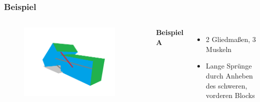 \documentclass{beamer}
\begin{document}
\begin{frame}
	\frametitle{Beispiel}
	\begin{columns}
		\begin{figure}
			\includegraphics[width=0.9\textwidth]{img/type1.png}
		\end{figure}
		\textbf{Beispiel A}\\
		\begin{itemize}
			\item 2 Gliedmaßen, 3 Muskeln
			\item Lange Sprünge durch Anheben des schweren, vorderen Blocks
		\end{itemize}		
	\end{columns}	
\end{frame}
\end{document}
